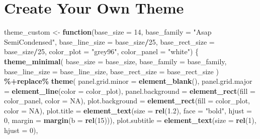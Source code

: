 \documentclass[
]{krantz}
\makeatletter
\newenvironment{Shaded}{\begin{snugshade}}{\end{snugshade}}
\newcommand{\AttributeTok}[1]{\textcolor[rgb]{0.27,0.27,0.27}{#1}}
\newcommand{\ConstantTok}[1]{\textcolor[rgb]{0.37,0.37,0.37}{#1}}
\newcommand{\ControlFlowTok}[1]{\textcolor[rgb]{0.27,0.27,0.27}{\textbf{#1}}}
\newcommand{\DecValTok}[1]{\textcolor[rgb]{0.06,0.06,0.06}{#1}}
\newcommand{\FloatTok}[1]{\textcolor[rgb]{0.06,0.06,0.06}{#1}}
\newcommand{\FunctionTok}[1]{\textcolor[rgb]{0.27,0.27,0.27}{\textbf{#1}}}
\newcommand{\NormalTok}[1]{#1}
\newcommand{\OtherTok}[1]{\textcolor[rgb]{0.37,0.37,0.37}{#1}}
\newcommand{\SpecialCharTok}[1]{\textcolor[rgb]{0.43,0.43,0.43}{\textbf{#1}}}
\newcommand{\StringTok}[1]{\textcolor[rgb]{0.5,0.5,0.5}{#1}}
\newenvironment{kframe}{%
\medskip{}
\setlength{\fboxsep}{.8em}
 \def\at@end@of@kframe{}%
 \ifinner\ifhmode%
  \def\at@end@of@kframe{\end{minipage}}%
  \begin{minipage}{\columnwidth}%
 \fi\fi%
 \def\FrameCommand##1{\hskip\@totalleftmargin \hskip-\fboxsep
 \colorbox{shadecolor}{##1}\hskip-\fboxsep
     \hskip-\linewidth \hskip-\@totalleftmargin \hskip\columnwidth}%
 \MakeFramed {\advance\hsize-\width
   \@totalleftmargin\z@ \linewidth\hsize
   \@setminipage}}%
 {\par\unskip\endMakeFramed%
 \at@end@of@kframe}
\renewenvironment{Shaded}{\begin{kframe}}{\end{kframe}}
\makeatother
\begin{document}
\hypertarget{create-your-own-theme}{%
\section{Create Your Own Theme}\label{create-your-own-theme}}

\begin{Shaded}
\begin{Highlighting}[]
\NormalTok{theme\_custom }\OtherTok{\textless{}{-}} \ControlFlowTok{function}\NormalTok{(}\AttributeTok{base\_size =} \DecValTok{14}\NormalTok{, }\AttributeTok{base\_family =} \StringTok{"Asap SemiCondensed"}\NormalTok{, }
                         \AttributeTok{base\_line\_size =}\NormalTok{ base\_size}\SpecialCharTok{/}\DecValTok{25}\NormalTok{, }\AttributeTok{base\_rect\_size =}\NormalTok{ base\_size}\SpecialCharTok{/}\DecValTok{25}\NormalTok{,}
                         \AttributeTok{color\_plot =} \StringTok{"grey96"}\NormalTok{, }\AttributeTok{color\_panel =} \StringTok{"white"}\NormalTok{) \{}
    \FunctionTok{theme\_minimal}\NormalTok{(}
      \AttributeTok{base\_size =}\NormalTok{ base\_size, }\AttributeTok{base\_family =}\NormalTok{ base\_family, }
      \AttributeTok{base\_line\_size =}\NormalTok{ base\_line\_size, }\AttributeTok{base\_rect\_size =}\NormalTok{ base\_rect\_size}
\NormalTok{    ) }\SpecialCharTok{\%+replace\%} 
    \FunctionTok{theme}\NormalTok{(}
      \AttributeTok{panel.grid.minor =} \FunctionTok{element\_blank}\NormalTok{(),}
      \AttributeTok{panel.grid.major =} \FunctionTok{element\_line}\NormalTok{(}\AttributeTok{color =}\NormalTok{ color\_plot),}
      \AttributeTok{panel.background =} \FunctionTok{element\_rect}\NormalTok{(}\AttributeTok{fill =}\NormalTok{ color\_panel, }\AttributeTok{color =} \ConstantTok{NA}\NormalTok{),}
      \AttributeTok{plot.background =} \FunctionTok{element\_rect}\NormalTok{(}\AttributeTok{fill =}\NormalTok{ color\_plot, }\AttributeTok{color =} \ConstantTok{NA}\NormalTok{),}
      \AttributeTok{plot.title =} \FunctionTok{element\_text}\NormalTok{(}\AttributeTok{size =} \FunctionTok{rel}\NormalTok{(}\FloatTok{1.2}\NormalTok{), }\AttributeTok{face =} \StringTok{"bold"}\NormalTok{, }\AttributeTok{hjust =} \DecValTok{0}\NormalTok{,}
                                  \AttributeTok{margin =} \FunctionTok{margin}\NormalTok{(}\AttributeTok{b =} \FunctionTok{rel}\NormalTok{(}\DecValTok{15}\NormalTok{))), }
      \AttributeTok{plot.subtitle =} \FunctionTok{element\_text}\NormalTok{(}\AttributeTok{size =} \FunctionTok{rel}\NormalTok{(}\DecValTok{1}\NormalTok{), }\AttributeTok{hjust =} \DecValTok{0}\NormalTok{),}

\end{Highlighting}
\end{Shaded}
\end{document}
